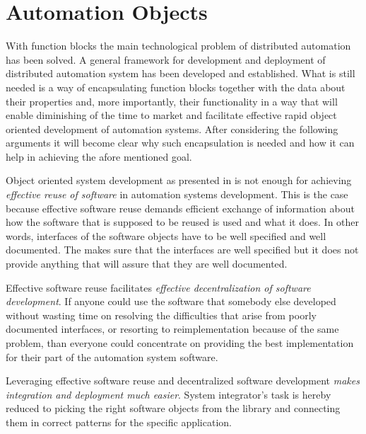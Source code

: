 \chapter{Automation Objects}
\label{automationobjects}

With function blocks the main technological problem of
distributed automation has been solved. A general framework
for development and deployment of distributed automation
system has been developed and established. What is still
needed is a way of encapsulating function blocks together
with the data about their properties and, more importantly,
their functionality in a way that will enable diminishing of
the time to market and facilitate effective rapid object
oriented development of automation systems.
After considering the following arguments it will become
clear why such encapsulation is needed and how it can help
in achieving the afore mentioned goal.

Object oriented system development as presented in
\cite{iec:614991:2000} is not enough for achieving
\textit{effective reuse of software} in automation systems
development. This is the case because effective software
reuse demands efficient exchange of information about how
the software that is supposed to be reused is used and what
it does. In other words, interfaces of the software objects
have to be well specified and well documented. The
\cite{iec:614991:2000} makes sure that the interfaces are
well specified but it does not provide anything that will
assure that they are well documented.

Effective software reuse facilitates \textit{effective
  decentralization of software development}. If anyone could
use the software that somebody else developed without
wasting time on resolving the difficulties that arise from
poorly documented interfaces, or resorting to
reimplementation because of the same problem, than everyone
could concentrate on providing the best implementation for
their part of the automation system software.

Leveraging effective software reuse and decentralized
software development \textit{makes integration and
  deployment much easier}. System integrator's task is
hereby reduced to picking the right software objects from
the library and connecting them in correct patterns for the
specific application.

